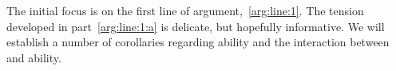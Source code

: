 \begin{note}
  The initial focus is on the first line of argument,~\ref{arg:line:1}.
  The tension developed in part~\ref{arg:line:1:a} is delicate, but hopefully informative.
  We will establish a number of corollaries regarding ability and the interaction between~\ESU{} and ability.
\end{note}







